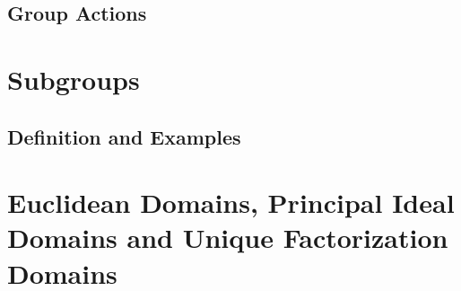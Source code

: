 \documentclass[cn,11pt,chinese]{elegantbook}
\numberwithin{equation}{section}
\begin{document}
\section{Group Actions}\label{section00107}




\chapter{Subgroups}\label{chapter002}
\section{Definition and Examples}\label{section00201}


\chapter{Euclidean Domains, Principal Ideal Domains and Unique Factorization Domains}\label{chapter008}





% 

\appendix
\end{document}

